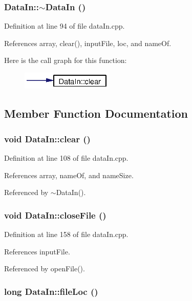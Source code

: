 \subsubsection{\setlength{\rightskip}{0pt plus 5cm}Data\-In::$\sim${\bf Data\-In} ()}\label{classDataIn_a3}




Definition at line 94 of file data\-In.cpp.

References array, clear(), input\-File, loc, and name\-Of.

Here is the call graph for this function:\begin{figure}[H]
\begin{center}
\leavevmode
\includegraphics[width=123pt]{classDataIn_a3_cgraph}
\end{center}
\end{figure}


\subsection{Member Function Documentation}
\subsubsection{\setlength{\rightskip}{0pt plus 5cm}void Data\-In::clear ()}\label{classDataIn_a4}




Definition at line 108 of file data\-In.cpp.

References array, name\-Of, and name\-Size.

Referenced by $\sim$Data\-In().
\subsubsection{\setlength{\rightskip}{0pt plus 5cm}void Data\-In::close\-File ()}\label{classDataIn_a19}




Definition at line 158 of file data\-In.cpp.

References input\-File.

Referenced by open\-File().
\subsubsection{\setlength{\rightskip}{0pt plus 5cm}long Data\-In::file\-Loc ()}\label{classDataIn_a21}




